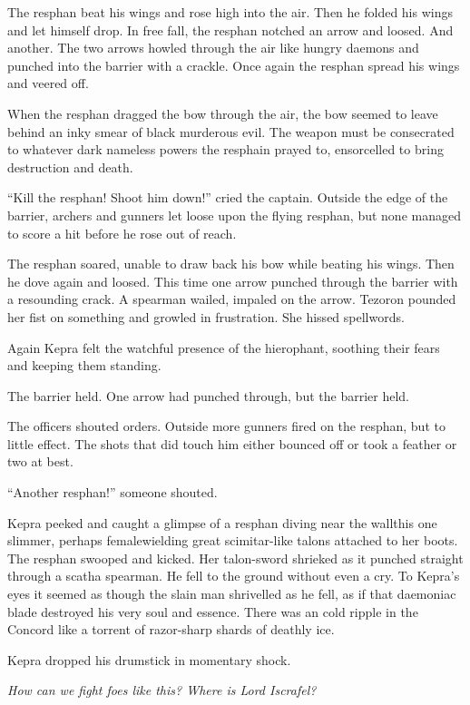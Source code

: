 \documentclass
  [a4paper,
   12pt,
   oneside
  ]%
  {article}
\begin{document}
The resphan beat his wings and rose high into the air. Then he folded his wings and let himself drop. In free fall, the resphan notched an arrow and loosed. And another. The two arrows howled through the air like hungry daemons and punched into the barrier with a crackle. Once again the resphan spread his wings and veered off.

When the resphan dragged the bow through the air, the bow seemed to leave behind an inky smear of black murderous evil. 
The weapon must be consecrated to whatever dark nameless powers the resphain prayed to, ensorcelled to bring destruction and death.

``Kill the resphan! Shoot him down!'' cried the captain. Outside the edge of the barrier, archers and gunners let loose upon the flying resphan, but none managed to score a hit before he rose out of reach. 

The resphan soared, unable to draw back his bow while beating his wings. 
Then he dove again and loosed. This time one arrow punched through the barrier with a resounding crack. 
A spearman wailed, impaled on the arrow. Tezoron pounded her fist on something and growled in frustration. She hissed spellwords. 

Again Kepra felt the watchful presence of the hierophant, soothing their fears and keeping them standing.

The barrier held. One arrow had punched through, but the barrier held. 

The officers shouted orders. Outside more gunners fired on the resphan, but to little effect. The shots that did touch him either bounced off or took a feather or two at best.

``Another resphan!'' someone shouted. 

Kepra peeked and caught a glimpse of a resphan diving near the wall\dash{}this one slimmer, perhaps female\dash{}wielding great scimitar-like talons attached to her boots.
The resphan swooped and kicked. Her talon-sword shrieked as it punched straight through a scatha spearman. 
He fell to the ground without even a cry. 
To Kepra’s eyes it seemed as though the slain man shrivelled as he fell, as if that daemoniac blade destroyed his very soul and essence. There was an cold ripple in the Concord like a torrent of razor-sharp shards of deathly ice. 

Kepra dropped his drumstick in momentary shock. 

\emph{How can we fight foes like this? Where is Lord Iscrafel?}
\end{document}
